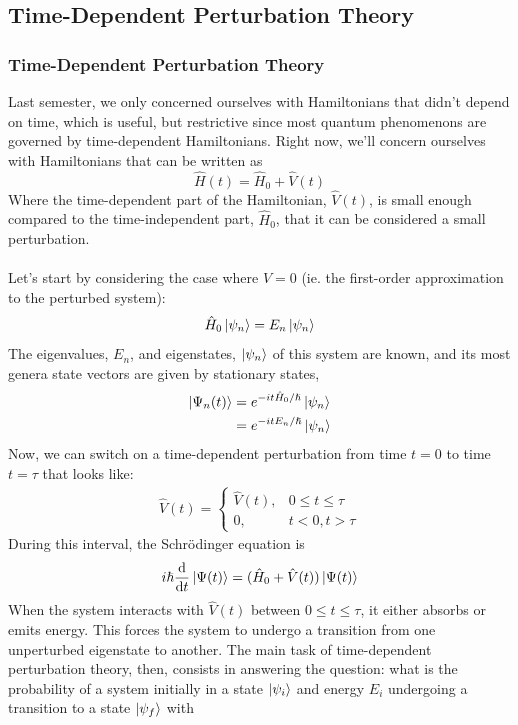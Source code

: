 \documentclass[a4paper]{article}
\begin{document}
\subsection{Time-Dependent Perturbation Theory}
\subsubsection{Time-Dependent Perturbation Theory} \label{hw2:b}
Last semester, we only concerned ourselves with Hamiltonians that didn't
depend on time, which is useful, but restrictive since most quantum
phenomenons are governed by time-dependent Hamiltonians. Right now, we'll
concern ourselves with Hamiltonians that can be written as
\[ \hat{H}(t) = \hat{H}_0 + \hat{V}(t) \]
Where the time-dependent part of the Hamiltonian, $\hat{V}(t)$, is small
enough compared to the time-independent part, $\hat{H}_0$, that it can
be considered a small perturbation.\\~\\
Let's start by considering the case where $V = 0$ (ie. the first-order
approximation to the perturbed system):
\[ \hat{H}_0\left\lvert \psi_n\right\rangle = E_n\left\lvert \psi_n\right\rangle \]
The eigenvalues, $E_n$, and eigenstates, $\left\lvert \psi_n\right\rangle$ of this system are
known, and its most genera state vectors are given by stationary states,
\begin{align*}
	\left\lvert \Psi_n(t)\right\rangle &= e^{-it\hat{H}_0/\hslash}\left\lvert \psi_n\right\rangle\\
			 &= e^{-itE_n/\hslash}\left\lvert \psi_n\right\rangle\\
\end{align*}
Now, we can switch on a time-dependent perturbation from time $t=0$ to time
$t=\tau$ that looks like:
\begin{align*}
	\hat{V}(t) =
\begin{cases}
	\hat{V}(t), & 0\leq t\leq \tau\\
	0, & t<0, t>\tau
\end{cases}
\end{align*}
During this interval, the Schr\"odinger equation is
\[ i\hslash\frac{\mathrm{d} }{\mathrm{d} t}\left\lvert \Psi(t)\right\rangle = (\hat{H}_0+\hat{V}(t))\left\lvert \Psi(t)\right\rangle \]
When the system interacts with $\hat{V}(t)$ between $0\leq t\leq\tau$,
it either absorbs or emits energy. This forces the system to undergo a
transition from one unperturbed eigenstate to another. The main task of
time-dependent perturbation theory, then, consists in answering the question:
what is the probability of a system initially in a state $\left\lvert \psi_i\right\rangle$ and
energy $E_i$ undergoing a transition to a state $\left\lvert \psi_f\right\rangle$ with
\end{document}
